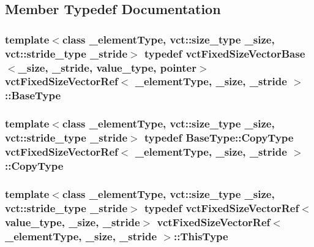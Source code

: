 \subsection{Member Typedef Documentation}
\hypertarget{classvct_fixed_size_vector_ref_a333e56f4164c12e33aff3e491d4fb879}{
\subsubsection[{Base\-Type}]{\setlength{\rightskip}{0pt plus 5cm}template$<$class \-\_\-element\-Type, vct\-::size\-\_\-type \-\_\-size, vct\-::stride\-\_\-type \-\_\-stride$>$ typedef {\bf vct\-Fixed\-Size\-Vector\-Base}$<$\-\_\-size, \-\_\-stride, value\-\_\-type, pointer$>$ {\bf vct\-Fixed\-Size\-Vector\-Ref}$<$ \-\_\-element\-Type, \-\_\-size, \-\_\-stride $>$\-::{\bf Base\-Type}}}\label{classvct_fixed_size_vector_ref_a333e56f4164c12e33aff3e491d4fb879}
\hypertarget{classvct_fixed_size_vector_ref_a43b5dfaa1ac96d6e47aaa9e44b4d7f92}{
\subsubsection[{Copy\-Type}]{\setlength{\rightskip}{0pt plus 5cm}template$<$class \-\_\-element\-Type, vct\-::size\-\_\-type \-\_\-size, vct\-::stride\-\_\-type \-\_\-stride$>$ typedef {\bf Base\-Type\-::\-Copy\-Type} {\bf vct\-Fixed\-Size\-Vector\-Ref}$<$ \-\_\-element\-Type, \-\_\-size, \-\_\-stride $>$\-::{\bf Copy\-Type}}}\label{classvct_fixed_size_vector_ref_a43b5dfaa1ac96d6e47aaa9e44b4d7f92}
\hypertarget{classvct_fixed_size_vector_ref_a3fc8fbdfc7492a38119e7ed7ef5bc289}{
\subsubsection[{This\-Type}]{\setlength{\rightskip}{0pt plus 5cm}template$<$class \-\_\-element\-Type, vct\-::size\-\_\-type \-\_\-size, vct\-::stride\-\_\-type \-\_\-stride$>$ typedef {\bf vct\-Fixed\-Size\-Vector\-Ref}$<$value\-\_\-type, \-\_\-size, \-\_\-stride$>$ {\bf vct\-Fixed\-Size\-Vector\-Ref}$<$ \-\_\-element\-Type, \-\_\-size, \-\_\-stride $>$\-::{\bf This\-Type}}}\label{classvct_fixed_size_vector_ref_a3fc8fbdfc7492a38119e7ed7ef5bc289}
